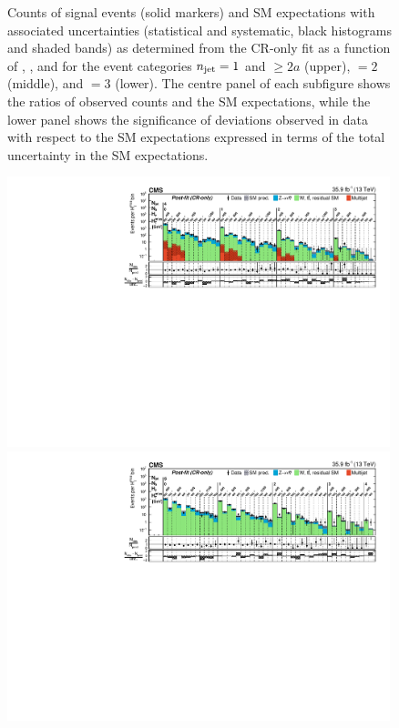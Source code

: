 \begin{figure}[!p]
  \caption{Counts of signal events (solid markers) and SM expectations
    with associated uncertainties (statistical and systematic, black
    histograms and shaded bands) as determined from the CR-only fit as
    a function of \nb, \scalht, and \mht for the event categories
    $n_{\text{jet}} = 1$ and ${\geq}2a$ (upper), $=2$ (middle), and $=3$
    (lower). The centre panel of each subfigure shows the ratios of
    observed counts and the SM expectations, while the lower panel
    shows the significance of deviations observed in data with respect
    to the SM expectations expressed in terms of the total uncertainty
    in the SM expectations.  }
  \label{fig:result1}
\end{figure}

\begin{figure}[!p]
  \centering
  \includegraphics[width=0.99\textwidth]{Figures/CMS-SUS-16-038_Figure_002-a.pdf}\\
  \includegraphics[width=0.99\textwidth]{Figures/CMS-SUS-16-038_Figure_002-b.pdf}\\

\end{figure}
